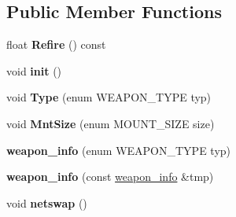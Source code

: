 \subsection*{Public Member Functions}
\begin{DoxyCompactItemize}
\item 
float {\bfseries Refire} () const \hypertarget{structweapon__info_aa314e5b76b31c964940b82005dca53cb}{}\label{structweapon__info_aa314e5b76b31c964940b82005dca53cb}

\item 
void {\bfseries init} ()\hypertarget{structweapon__info_a5c179733d235d0c0de6a2c98ac3a2a3f}{}\label{structweapon__info_a5c179733d235d0c0de6a2c98ac3a2a3f}

\item 
void {\bfseries Type} (enum W\+E\+A\+P\+O\+N\+\_\+\+T\+Y\+PE typ)\hypertarget{structweapon__info_a5efd7f9c62f0113999d941b20d8fbc5d}{}\label{structweapon__info_a5efd7f9c62f0113999d941b20d8fbc5d}

\item 
void {\bfseries Mnt\+Size} (enum M\+O\+U\+N\+T\+\_\+\+S\+I\+ZE size)\hypertarget{structweapon__info_acd3dbb6b0533930cfab82fb9ffd3f06b}{}\label{structweapon__info_acd3dbb6b0533930cfab82fb9ffd3f06b}

\item 
{\bfseries weapon\+\_\+info} (enum W\+E\+A\+P\+O\+N\+\_\+\+T\+Y\+PE typ)\hypertarget{structweapon__info_a3a926c923fd38658deda41820b88bef5}{}\label{structweapon__info_a3a926c923fd38658deda41820b88bef5}

\item 
{\bfseries weapon\+\_\+info} (const \hyperlink{structweapon__info}{weapon\+\_\+info} \&tmp)\hypertarget{structweapon__info_ad3123110e69ccf9dd828a0f247f82348}{}\label{structweapon__info_ad3123110e69ccf9dd828a0f247f82348}

\item 
void {\bfseries netswap} ()\hypertarget{structweapon__info_a73e499794603ff5a47db318080c7c9f3}{}\label{structweapon__info_a73e499794603ff5a47db318080c7c9f3}

\end{DoxyCompactItemize}
